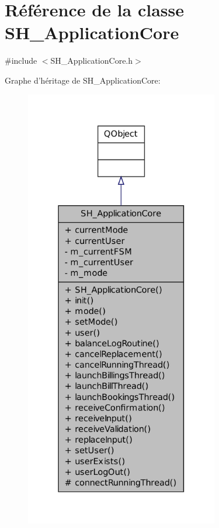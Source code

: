 \hypertarget{classSH__ApplicationCore}{\section{Référence de la classe S\-H\-\_\-\-Application\-Core}
\label{classSH__ApplicationCore}
}


{\ttfamily \#include $<$S\-H\-\_\-\-Application\-Core.\-h$>$}



Graphe d'héritage de S\-H\-\_\-\-Application\-Core\-:
\nopagebreak
\begin{figure}[H]
\begin{center}
\leavevmode
\includegraphics[height=550pt]{classSH__ApplicationCore__inherit__graph}
\end{center}
\end{figure}


